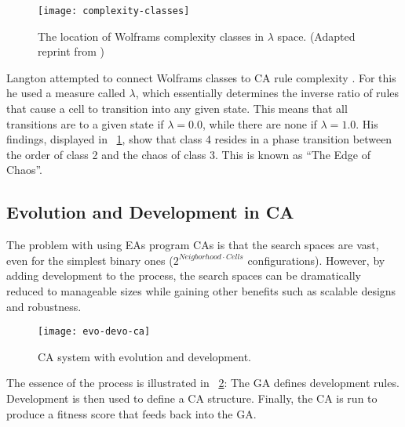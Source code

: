 \begin{figure}[!ht]
    \centering
    \texttt{[image: complexity-classes]}
    \caption[Complexity classes]{
        The location of Wolframs complexity classes in $\lambda$ space.
        (Adapted reprint from \cite{langton1990edgeofchaos})
    }
    \label{fig:complexity-classes}
\end{figure}

Langton attempted to connect Wolframs classes to CA rule complexity \cite{langton1990edgeofchaos}.
For this he used a measure called $\lambda$, which essentially determines the inverse ratio of rules that cause a cell to transition into any given state.
This means that all transitions are to a given state if $\lambda=0.0$, while there are none if $\lambda=1.0$.
His findings, displayed in \figurename~\ref{fig:complexity-classes}, show that class 4 resides in a phase transition between the order of class 2 and the chaos of class 3.
This is known as ``The Edge of Chaos''.

\subsection{Evolution and Development in CA}

The problem with using EAs program CAs is that the search spaces are vast, even for the simplest binary ones ($2^{Neigborhood \cdot Cells}$ configurations\footnotemark).
However, by adding development to the process, the search spaces can be dramatically reduced to manageable sizes while gaining other benefits such as scalable designs and robustness.


\begin{figure}[!ht]
    \centering
    \texttt{[image: evo-devo-ca]}
    \caption[CA system with evolution and development]{
        CA system with evolution and development.
    }
    \label{fig:evo-devo-ca}
\end{figure}

The essence of the process is illustrated in \figurename~\ref{fig:evo-devo-ca}:
The GA defines development rules.
Development is then used to define a CA structure.
Finally, the CA is run to produce a fitness score that feeds back into the GA.


